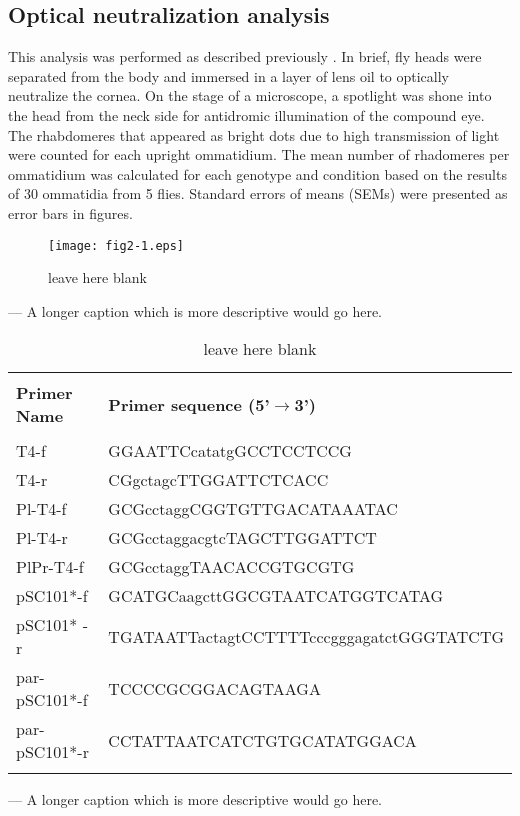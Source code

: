 \subsection{Optical neutralization analysis}
This analysis was performed as described previously \cite{Franceschini1971}.  In brief, fly heads were separated from the body and immersed in a layer of lens oil to optically neutralize the cornea.  On the stage of a microscope, a spotlight was shone into the head from the neck side for antidromic illumination of the compound eye.  The rhabdomeres that appeared as bright dots due to high transmission of light were counted for each upright ommatidium.  The mean number of rhadomeres per ommatidium was calculated for each genotype and condition based on the results of 30 ommatidia from 5 flies.  Standard errors of means (SEMs) were presented as error bars in figures.

\newpage
\begin{figure}
	\centering
		\texttt{[image: fig2-1.eps]}
	\caption[Short caption for the List of Figures]{leave here blank}
	\label{fig2-1}
\end{figure}
\clearpage {}--- A longer caption which is more descriptive would go here.\clearpage

\begin{table}
\caption[Short caption for the List of Table]{leave here blank}
	\centering
		\begin{tabular}{ll}
			\hline\\
			\textbf{Primer Name}	& \textbf{Primer sequence (5'$\rightarrow$3')}\\ 
			\hline\\
			T4-f	& GGAATTCcatatgGCCTCCTCCG\\
			T4-r	& CGgctagcTTGGATTCTCACC\\
			Pl-T4-f	& GCGcctaggCGGTGTTGACATAAATAC\\
			Pl-T4-r	& GCGcctaggacgtcTAGCTTGGATTCT\\
			PlPr-T4-f	& GCGcctaggTAACACCGTGCGTG\\
			pSC101*-f	& GCATGCaagcttGGCGTAATCATGGTCATAG\\
			pSC101* -r	& TGATAATTactagtCCTTTTcccgggagatctGGGTATCTG\\
			par-pSC101*-f & TCCCCGCGGACAGTAAGA\\
			par-pSC101*-r & CCTATTAATCATCTGTGCATATGGACA\\
			\hline\\
		\end{tabular}
	\label{tab:Oligo}
\end{table}
\clearpage {}--- A longer caption which is more descriptive would go here.\clearpage